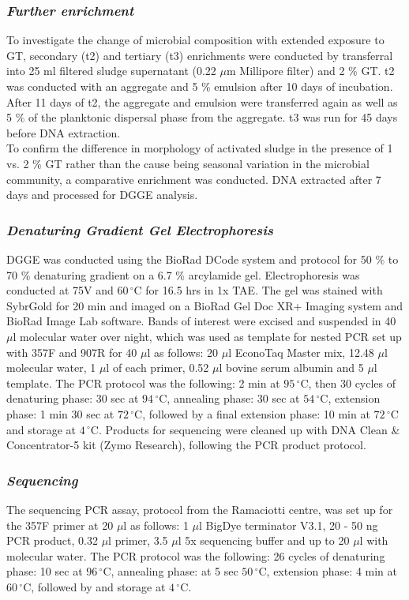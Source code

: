 \documentclass[twoside]{article}
\begin{document}
\subsubsection{\emph{Further enrichment}}
To investigate the change of microbial composition with extended exposure to GT, secondary (t2) and tertiary (t3) enrichments were conducted by transferral into 25 ml filtered sludge supernatant (0.22 $\mu$m Millipore filter) and 2 \% GT. t2 was conducted with an aggregate and 5 \% emulsion after 10 days of incubation. After 11 days of t2, the aggregate and emulsion were transferred again as well as 5 \% of the planktonic dispersal phase from the aggregate. t3 was run for 45 days before DNA extraction.\\

To confirm the difference in morphology of activated sludge in the presence of 1 vs. 2 \% GT rather than the cause being seasonal variation in the microbial community, a comparative enrichment was conducted. DNA extracted after 7 days and processed for DGGE analysis.
 
\subsubsection{\emph{Denaturing Gradient Gel Electrophoresis}}
DGGE was conducted using the BioRad DCode system and protocol for 50 \% to 70 \% denaturing gradient on a 6.7 \% arcylamide gel. Electrophoresis was conducted at 75V and $60\,^{\circ}\mathrm{C}$ for 16.5 hrs in 1x TAE. The gel was stained with SybrGold for 20 min and imaged on a BioRad Gel Doc XR+ Imaging system and BioRad Image Lab software. Bands of interest were excised and suspended in 40 $\mu$l molecular water over night, which was used as template for nested PCR set up with 357F and 907R for 40 $\mu$l as follows: 20 $\mu$l EconoTaq Master mix, 12.48 $\mu$l molecular water, 1 $\mu$l of each primer, 0.52 $\mu$l bovine serum albumin and 5 $\mu$l template. The PCR protocol was the following: 2 min at $95\,^{\circ}\mathrm{C}$, then 30 cycles of denaturing phase: 30 sec at $94\,^{\circ}\mathrm{C}$, annealing phase: 30 sec at  $54\,^{\circ}\mathrm{C}$, extension phase: 1 min 30 sec at $72\,^{\circ}\mathrm{C}$, followed by a final extension phase: 10 min at $72\,^{\circ}\mathrm{C}$ and storage at $4\,^{\circ}\mathrm{C}$. Products for sequencing were cleaned up with DNA Clean \& Concentrator-5 kit (Zymo Research), following the PCR product protocol.

\subsubsection{\emph{Sequencing}}
The sequencing PCR assay, protocol from the Ramaciotti centre, was set up for the 357F primer at 20 $\mu$l as follows: 1 $\mu$l BigDye terminator V3.1, 20 - 50 ng PCR product, 0.32 $\mu$l primer, 3.5 $\mu$l 5x sequencing buffer and up to 20 $\mu$l with molecular water. The PCR protocol was the following: 26 cycles of denaturing phase: 10 sec at $96\,^{\circ}\mathrm{C}$, annealing phase:  at 5 sec $50\,^{\circ}\mathrm{C}$, extension phase: 4 min at $60\,^{\circ}\mathrm{C}$, followed by and storage at $4\,^{\circ}\mathrm{C}$.\\
\end{document}

